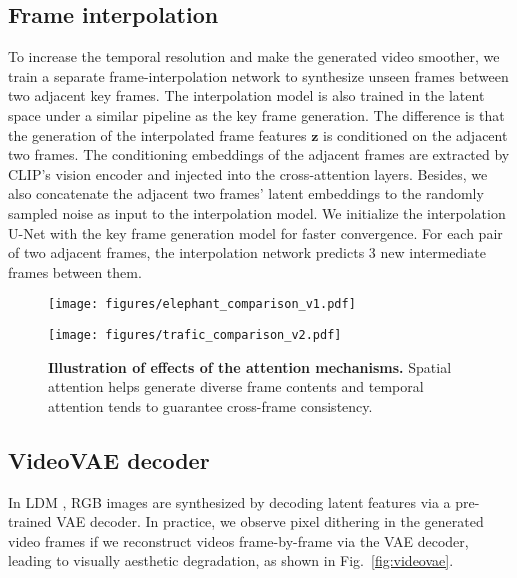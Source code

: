 \documentclass[10pt,twocolumn,letterpaper]{article}
\def\vz{{\bm{z}}}
\begin{document}
 
\subsection{Frame interpolation}
\label{subsec:interpol}

To increase the temporal resolution and make the generated video smoother, we train a separate frame-interpolation network to synthesize unseen frames between two adjacent key frames. The interpolation model is also trained in the latent space under a similar pipeline as the key frame generation. The difference is that the generation   of the interpolated frame features   $\vz$ is conditioned on the adjacent two frames. The conditioning embeddings of the adjacent frames are extracted by CLIP's vision  encoder and injected into the cross-attention layers. 
Besides, we also concatenate the adjacent two frames' latent embeddings to the randomly sampled noise as input to the interpolation model. 
We initialize the interpolation U-Net  with the key frame generation model for faster convergence. 
For each pair of two adjacent frames, the interpolation network predicts 3 new intermediate frames between them.   


\begin{figure*}[t] 
\small
\centering
    \begin{minipage}{0.52\linewidth}
        \centering
\texttt{[image: figures/elephant\_comparison\_v1.pdf]}


    \end{minipage}\hfill
    \begin{minipage}{0.46\linewidth}
        \centering
        \texttt{[image: figures/trafic\_comparison\_v2.pdf]}
\end{minipage}\hfill
    \vspace{-3mm}
\caption{\textbf{Illustration of effects of the attention mechanisms.} Spatial attention helps generate diverse frame contents and temporal attention  tends to guarantee cross-frame consistency. 
}
\vspace{-3mm}
\label{fig:spatiotemporal}
\end{figure*}









\subsection{VideoVAE decoder}
\label{subsec:video_decoder}
In  LDM \cite{rombach_high-resolution_2022}, RGB images are synthesized by decoding latent features via a pre-trained VAE decoder. In practice, we observe pixel dithering   in the generated video frames if we reconstruct videos frame-by-frame via the VAE decoder, leading to visually aesthetic degradation, as shown in Fig.~\ref{fig:videovae}. 
\end{document}
